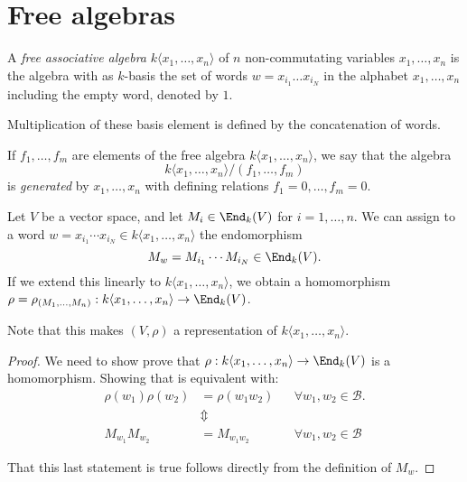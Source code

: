 \section{Free algebras}
\begin{defn}
A \emph{free associative algebra} \(k\langle x_{1},\ldots ,x_{n}\rangle \) of \(n\) non-commutating variables \(x_{1},\ldots ,x_{n}\) is the algebra with as \(k\)-basis the set of words \(w=x_{i_{1}}\ldots x_{i_N}\) in the alphabet \(x_{1},\ldots ,x_{n}\) including the empty word, denoted by \(1\).

Multiplication of these basis element is defined by the concatenation of words.
\end{defn}

\begin{defn}

If \(f_{1},\ldots ,f_{m}\) are elements of the free algebra \(k\langle x_{1},\ldots ,x_{n}\rangle \), we say that the algebra
\[k\langle x_{1},\ldots ,x_{n}\rangle /(f_{1},\ldots ,f_{m})\]
is \emph{generated} by \(x_{1},\ldots ,x_{n}\) with defining relations \(f_{1}=0,\ldots ,f_{m}=0\).
\end{defn}

\begin{thm}
Let \(V\) be a vector space, and let \(M_{i}\in \End_{k}(V)\) for \(i=1,\ldots ,n\). We can assign to a word \(w=x_{i_{1}}\cdots x_{i_N}\in k\langle x_{1},\ldots ,x_{n}\rangle \) the endomorphism
%
\[M_{w}=M_{i_{1}}\cdots M_{i_N}\in \End_{k}(V).\]
%
If we extend this linearly to \(k\langle x_{1},\ldots ,x_{n}\rangle \), we obtain a homomorphism \(\rho =\rho _{(M_{1},\ldots ,M_{n})} : k\langle x_{1},\ldots ,x_{n}\rangle \to \End_k (V)\). 

Note that this makes $(V,\rho)$ a representation of \(k\langle x_{1},\ldots ,x_{n}\rangle \).
\end{thm}

\begin{proof}
We need to show prove that \(\rho :k\langle x_{1},\ldots ,x_{n}\rangle \rightarrow \End_{k}(V)\) is a homomorphism. Showing that is equivalent with:
\begin{align*}\rho (w_{1})\rho (w_{2})&=\rho (w_{1}w_{2}) && \forall w_{1},w_{2}\in \mathcal{B}. \\
&\Updownarrow  \\
M_{w_{1}}M_{w_{2}}&=M_{w_{1}w_{2}} && \forall w_{1},w_{2}\in \mathcal{B}
\end{align*}

That this last statement is true follows directly from the definition of \(M_{w}\).
\end{proof}

